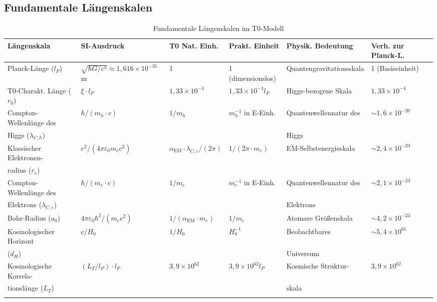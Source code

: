 \documentclass[12pt,a4paper]{article}
\newcommand{\alphaEM}{\alpha_{\text{EM}}}
\begin{document}
	\subsection{Fundamentale Längenskalen}
	
	\begin{table}[ht]
		\centering
		\begin{adjustbox}{scale=0.65}
			\begin{tabular}{llllll}
				\hline
				\textbf{Längenskala} & \textbf{SI-Ausdruck} & \textbf{T0 Nat. Einh.} & \textbf{Prakt. Einheit} & \textbf{Physik. Bedeutung} & \textbf{Verh. zur Planck-L.} \\
				\hline
				Planck-Länge ($l_P$) & $\sqrt{\hbar G/c^3} \approx 1,616 \times 10^{-35}$ m & 1 & 1 (dimensionslos) & Quantengravitationsskala & 1 (Basiseinheit) \\
				T0-Charakt. Länge ($r_0$) & $\xi \cdot l_P$ & $1,33 \times 10^{-4}$ & $1,33 \times 10^{-4} l_P$ & Higgs-bezogene Skala & $1,33 \times 10^{-4}$ \\
				Compton-Wellenlänge des & $\hbar/(m_h \cdot c)$ & $1/m_h$ & $m_h^{-1}$ in E-Einh. & Quantenwellennatur des & $\sim 1,6 \times 10^{-20}$ \\
				Higgs ($\lambda_{C,h}$) & & & & Higgs & \\
				Klassischer Elektronen- & $e^2/(4\pi\varepsilon_0m_e c^2)$ & $\alphaEM \cdot \lambda_{C,e}/(2\pi)$ & $1/(2\pi \cdot m_e)$ & EM-Selbstenergieskala & $\sim 2,4 \times 10^{-23}$ \\
				radius ($r_e$) & & & & & \\
				Compton-Wellenlänge des & $\hbar/(m_e \cdot c)$ & $1/m_e$ & $m_e^{-1}$ in E-Einh. & Quantenwellennatur des & $\sim 2,1 \times 10^{-23}$ \\
				Elektrons ($\lambda_{C,e}$) & & & & Elektrons & \\
				Bohr-Radius ($a_0$) & $4\pi\varepsilon_0\hbar^2/(m_e e^2)$ & $1/(\alphaEM \cdot m_e)$ & $1/m_e$ & Atomare Größenskala & $\sim 4,2 \times 10^{-23}$ \\
				Kosmologischer Horizont & $c/H_0$ & $1/H_0$ & $H_0^{-1}$ & Beobachtbares & $\sim 5,4 \times 10^{61}$ \\
				($d_H$) & & & & Universum & \\
				Kosmologische Korrela- & $(L_T/l_P) \cdot l_P$ & $3,9 \times 10^{62}$ & $3,9 \times 10^{62} l_P$ & Kosmische Struktur- & $3,9 \times 10^{62}$ \\
				tionslänge ($L_T$) & & & & skala & \\
				\hline
				\multicolumn{5}{c}{} \\
				\hline
			\end{tabular}
		\end{adjustbox}
		\caption{Fundamentale Längenskalen im T0-Modell}
		\label{tab:length_scales}
	\end{table}
	
\end{document}
